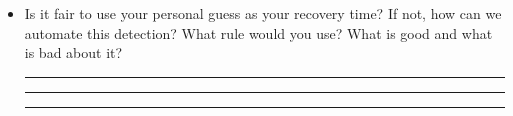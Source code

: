 \documentclass[11pt]{article}
\begin{document}
\begin{enumerate}
\begin{itemize}
\vspace{1.5em}
\rule{16cm}{0.5pt}

\vspace{1.5em}
\rule{16cm}{0.5pt}

\item 
Is it fair to use your personal guess as your recovery time? If not, how
can we automate this detection? What rule would you use? What is good
and what is bad about it?

\vspace{1.5em}
\rule{16cm}{0.5pt}

\vspace{1.5em}
\rule{16cm}{0.5pt}

\vspace{1.5em}
\rule{16cm}{0.5pt}

\end{itemize}

\end{enumerate}
\end{document}
